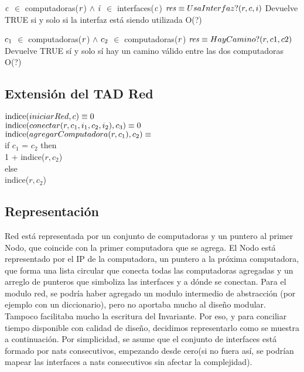  {$\text{\textit{c}}$ $\in$ computadoras($\text{\textit{r}}$) $\land$ $\text{\textit{i}}$ $\in$ interfaces($\text{\textit{c}}$)}
 {$\text{\textit{res}} \equiv UsaInterfaz?(r,c,i)$}
 {Devuelve TRUE si y solo si la interfaz está siendo utilizada}
 {O(?)}

 {$\text{\textit{$c_{1}$}}$ $\in$ computadoras($\text{\textit{r}}$) $\land$ $\text{\textit{$c_{2}$}}$ $\in$ computadoras($\text{\textit{r}}$)}
 {$\text{\textit{res}} \equiv HayCamino?(r,c1,c2)$}
 {Devuelve TRUE sí y solo sí hay un camino válido entre las dos computadoras}
 {O(?)}

\subsection{Extensión del TAD Red}
$\text{\normalfont indice}(iniciarRed, c) \equiv 0$ \\
$\text{\normalfont indice}(conectar(r,c_{1},i_{1},c_{2},i_{2}), c_{3}) \equiv 0$ \\
$\text{\normalfont indice}(agregarComputadora(r,c_{1}), c_{2}) \equiv$ 
	\\ if $c_{1}$ = $c_{2}$ then \\ 1 + indice($r,c_{2}$) \\ else \\ indice($r,c_{2}$)


\subsection{Representación}
Red está representada por un conjunto de computadoras y un puntero al primer Nodo, que coincide con la primer computadora que se agrega. El Nodo está representado por el IP de la computadora, un puntero a la próxima computadora, que forma una lista circular que conecta todas las computadoras agregadas y un arreglo de punteros que simboliza las interfaces y a dónde se conectan.
Para el modulo red, se podría haber agregado un modulo intermedio de abstracción (por ejemplo con un diccionario), pero no aportaba mucho al diseño modular. Tampoco facilitaba mucho la escritura del Invariante. Por eso, y para conciliar tiempo disponible con calidad de diseño, decidimos representarlo como se muestra a continuación. Por simplicidad, se asume que el conjunto de interfaces está formado por nats consecutivos, empezando desde cero(si no fuera así, se podrían mapear las interfaces a nats consecutivos sin afectar la complejidad).

